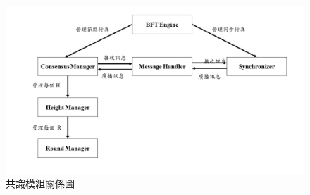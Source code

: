 \begin{figure}[htb]
\centering
\includegraphics[scale=0.45]{images/5.jpg}
\caption{共識模組關係圖}
\label{i:byz-latency}
\end{figure}